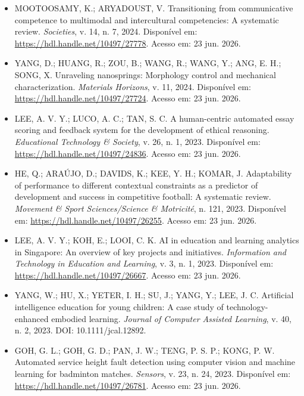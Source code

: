 \documentclass[english]{textolivre}
\begin{document}
\begin{itemize}
\item[] MOOTOOSAMY, K.; ARYADOUST, V. Transitioning from communicative competence to multimodal and intercultural competencies: A systematic review. \textit{Societies}, v. 14, n. 7, 2024. Disponível em: \url{https://hdl.handle.net/10497/27778}. Acesso em: 23 jun. 2026.

\item[] YANG, D.; HUANG, R.; ZOU, B.; WANG, R.; WANG, Y.; ANG, E. H.; SONG, X. Unraveling nanosprings: Morphology control and mechanical characterization. \textit{Materials Horizons}, v. 11, 2024. Disponível em: \url{https://hdl.handle.net/10497/27724}. Acesso em: 23 jun. 2026.

\item[] LEE, A. V. Y.; LUCO, A. C.; TAN, S. C. A human-centric automated essay scoring and feedback system for the development of ethical reasoning. \textit{Educational Technology \& Society}, v. 26, n. 1, 2023. Disponível em: \url{https://hdl.handle.net/10497/24836}. Acesso em: 23 jun. 2026.

\item[] HE, Q.; ARAÚJO, D.; DAVIDS, K.; KEE, Y. H.; KOMAR, J. Adaptability of performance to different contextual constraints as a predictor of development and success in competitive football: A systematic review. \textit{Movement \& Sport Sciences/Science \& Motricité}, n. 121, 2023. Disponível em: \url{https://hdl.handle.net/10497/26255}. Acesso em: 23 jun. 2026.

\item[] LEE, A. V. Y.; KOH, E.; LOOI, C. K. AI in education and learning analytics in Singapore: An overview of key projects and initiatives. \textit{Information and Technology in Education and Learning}, v. 3, n. 1, 2023. Disponível em: \url{https://hdl.handle.net/10497/26667}. Acesso em: 23 jun. 2026.

\item[] YANG, W.; HU, X.; YETER, I. H.; SU, J.; YANG, Y.; LEE, J. C. Artificial intelligence education for young children: A case study of technology-enhanced embodied learning. \textit{Journal of Computer Assisted Learning}, v. 40, n. 2, 2023. DOI: 10.1111/jcal.12892.

\item[] GOH, G. L.; GOH, G. D.; PAN, J. W.; TENG, P. S. P.; KONG, P. W. Automated service height fault detection using computer vision and machine learning for badminton matches. \textit{Sensors}, v. 23, n. 24, 2023. Disponível em: \url{https://hdl.handle.net/10497/26781}. Acesso em: 23 jun. 2026.


\end{itemize}
\end{document}
